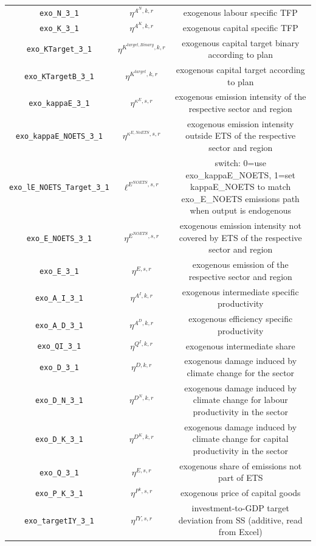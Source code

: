 \begin{center}
\begin{longtable}{ccc}
\texttt{exo\_N\_3\_1} & ${\eta^{A^{N},k,r}}$ & exogenous labour specific TFP\\
\texttt{exo\_K\_3\_1} & ${\eta^{A^{K},k,r}}$ & exogenous capital specific TFP\\
\texttt{exo\_KTarget\_3\_1} & ${\eta^{K^{target,Binary},k,r}}$ & exogenous capital target binary according to plan\\
\texttt{exo\_KTargetB\_3\_1} & ${\eta^{K^{target},k,r}}$ & exogenous capital target according to plan\\
\texttt{exo\_kappaE\_3\_1} & ${\eta^{\kappa^{E},s,r}}$ & exogenous emission intensity of the respective sector and region\\
\texttt{exo\_kappaE\_NOETS\_3\_1} & ${\eta^{\kappa^{E,No ETS},s,r}}$ & exogenous emission intensity outside ETS of the respective sector and region\\
\texttt{exo\_lE\_NOETS\_Target\_3\_1} & ${\ell^{E^{NOETS},s,r}}$ & switch: 0=use exo\_kappaE\_NOETS, 1=set kappaE\_NOETS to match exo\_E\_NOETS emissions path when output is endogenous\\
\texttt{exo\_E\_NOETS\_3\_1} & ${\eta^{E^{NOETS},s,r}}$ & exogenous emission intensity not covered by ETS of the respective sector and region\\
\texttt{exo\_E\_3\_1} & ${\eta^{E,s,r}}$ & exogenous emission of the respective sector and region\\
\texttt{exo\_A\_I\_3\_1} & ${\eta^{A^{I},k,r}}$ & exogenous intermediate specific productivity\\
\texttt{exo\_A\_D\_3\_1} & ${\eta^{A^{D},k,r}}$ & exogenous efficiency specific productivity\\
\texttt{exo\_QI\_3\_1} & ${\eta^{Q^{I},k,r}}$ & exogenous intermediate share\\
\texttt{exo\_D\_3\_1} & ${\eta^{D,k,r}}$ & exogenous damage induced by climate change for the sector\\
\texttt{exo\_D\_N\_3\_1} & ${\eta^{D^{N},k,r}}$ & exogenous damage induced by climate change for labour productivity in the sector\\
\texttt{exo\_D\_K\_3\_1} & ${\eta^{D^{K},k,r}}$ & exogenous damage induced by climate change for capital productivity in the sector\\
\texttt{exo\_Q\_3\_1} & ${\eta^{E,s,r}}$ & exogenous share of emissions not part of ETS\\
\texttt{exo\_P\_K\_3\_1} & ${\eta^{P^k,s,r}}$ & exogenous price of capital goods\\
\texttt{exo\_targetIY\_3\_1} & ${\eta^{IY,s,r}}$ & investment-to-GDP target deviation from SS (additive, read from Excel)\\

\end{longtable}
\end{center}
